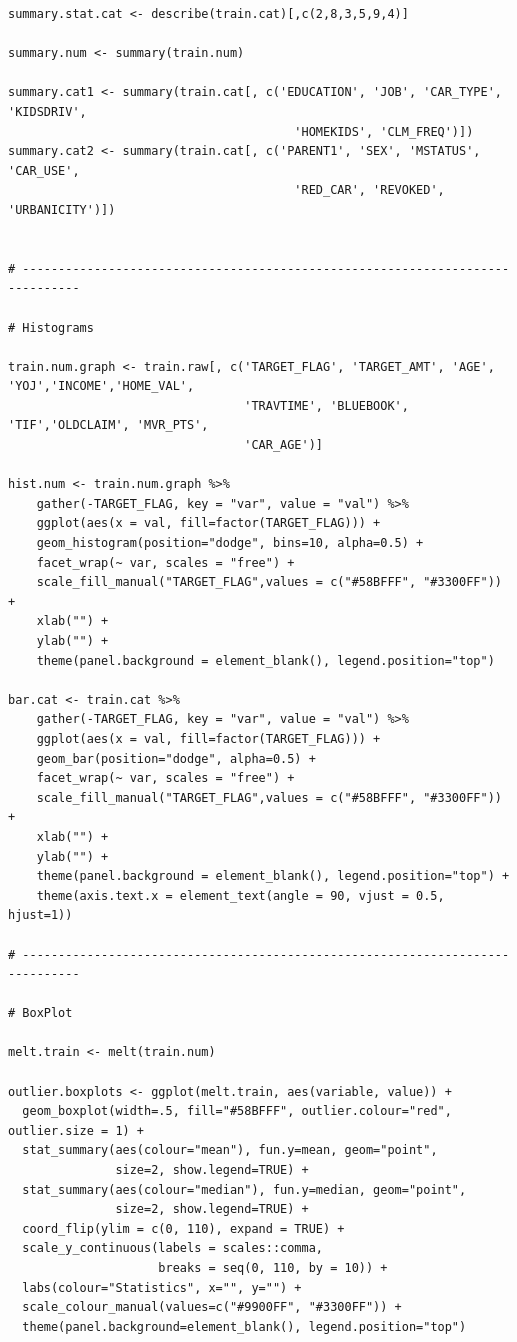 \documentclass[]{article}
\begin{document}
\begin{verbatim}
summary.stat.cat <- describe(train.cat)[,c(2,8,3,5,9,4)]

summary.num <- summary(train.num)

summary.cat1 <- summary(train.cat[, c('EDUCATION', 'JOB', 'CAR_TYPE', 'KIDSDRIV', 
                                        'HOMEKIDS', 'CLM_FREQ')])
summary.cat2 <- summary(train.cat[, c('PARENT1', 'SEX', 'MSTATUS', 'CAR_USE', 
                                        'RED_CAR', 'REVOKED', 'URBANICITY')])


# ------------------------------------------------------------------------------

# Histograms

train.num.graph <- train.raw[, c('TARGET_FLAG', 'TARGET_AMT', 'AGE', 'YOJ','INCOME','HOME_VAL',
                                 'TRAVTIME', 'BLUEBOOK', 'TIF','OLDCLAIM', 'MVR_PTS',
                                 'CAR_AGE')]

hist.num <- train.num.graph %>%
    gather(-TARGET_FLAG, key = "var", value = "val") %>%
    ggplot(aes(x = val, fill=factor(TARGET_FLAG))) +
    geom_histogram(position="dodge", bins=10, alpha=0.5) +
    facet_wrap(~ var, scales = "free") +
    scale_fill_manual("TARGET_FLAG",values = c("#58BFFF", "#3300FF")) +
    xlab("") +
    ylab("") +
    theme(panel.background = element_blank(), legend.position="top")

bar.cat <- train.cat %>%
    gather(-TARGET_FLAG, key = "var", value = "val") %>%
    ggplot(aes(x = val, fill=factor(TARGET_FLAG))) +
    geom_bar(position="dodge", alpha=0.5) +
    facet_wrap(~ var, scales = "free") +
    scale_fill_manual("TARGET_FLAG",values = c("#58BFFF", "#3300FF")) +
    xlab("") +
    ylab("") +
    theme(panel.background = element_blank(), legend.position="top") +
    theme(axis.text.x = element_text(angle = 90, vjust = 0.5, hjust=1))

# ------------------------------------------------------------------------------

# BoxPlot

melt.train <- melt(train.num)

outlier.boxplots <- ggplot(melt.train, aes(variable, value)) +
  geom_boxplot(width=.5, fill="#58BFFF", outlier.colour="red", outlier.size = 1) +
  stat_summary(aes(colour="mean"), fun.y=mean, geom="point",
               size=2, show.legend=TRUE) +
  stat_summary(aes(colour="median"), fun.y=median, geom="point",
               size=2, show.legend=TRUE) +
  coord_flip(ylim = c(0, 110), expand = TRUE) +
  scale_y_continuous(labels = scales::comma,
                     breaks = seq(0, 110, by = 10)) +
  labs(colour="Statistics", x="", y="") +
  scale_colour_manual(values=c("#9900FF", "#3300FF")) +
  theme(panel.background=element_blank(), legend.position="top")


\end{verbatim}
\end{document}
